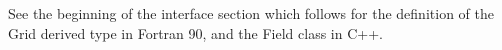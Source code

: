 

See the beginning of the interface section which
follows for the definition of the Grid derived type
in Fortran 90, and the Field class in C++.


